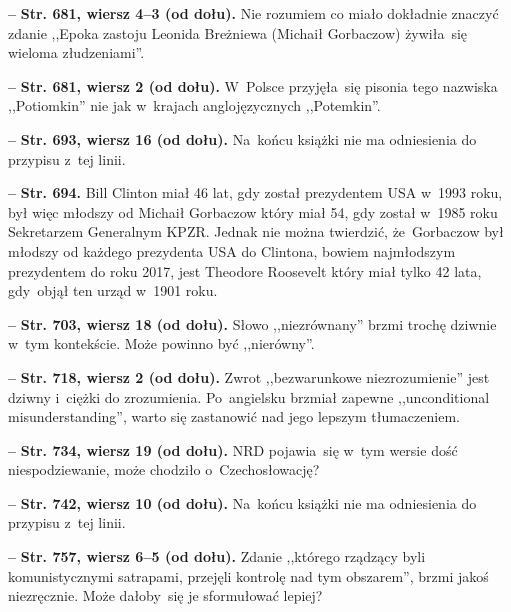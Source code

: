 \documentclass[a4paper,11pt]{article}
\newcommand{\spaceFour}{0.5em}
\newcommand{\tb}{\textbf}
\newcommand{\noi}{\noindent}
\newcommand{\start}{\noi \tb{--} {}}
\newcommand{\Str}[1]{\tb{Str. #1.}}
\newcommand{\StrWd}[2]{\tb{Str. #1, wiersz #2 (od dołu).}}
\begin{document}
\vspace{\spaceFour}


\start \StrWd{681}{4--3} Nie rozumiem co miało dokładnie znaczyć
zdanie ,,Epoka zastoju Leonida Breżniewa (Michaił Gorbaczow)
żywiła~się wieloma złudzeniami''.

\vspace{\spaceFour}

\start \StrWd{681}{2} W~Polsce przyjęła~się pisonia tego nazwiska
,,Potiomkin'' nie jak w~krajach anglojęzycznych ,,Potemkin''.

\vspace{\spaceFour}


\start \StrWd{693}{16} Na~końcu książki nie ma odniesienia do przypisu
z~tej linii.

\vspace{\spaceFour}


\start \Str{694} Bill Clinton miał 46 lat, gdy został prezydentem USA
w~1993 roku, był więc młodszy od Michaił Gorbaczow który miał 54, gdy
został w~1985 roku Sekretarzem Generalnym KPZR. Jednak nie można
twierdzić, że~Gorbaczow był młodszy od każdego prezydenta USA do
Clintona, bowiem najmłodszym prezydentem do roku 2017, jest Theodore
Roosevelt który miał tylko 42 lata, gdy~objął ten urząd w~1901 roku.

\vspace{\spaceFour}


\start \StrWd{703}{18} Słowo ,,niezrównany'' brzmi trochę dziwnie
w~tym kontekście. Może powinno być ,,nierówny''.

\vspace{\spaceFour}


\start \StrWd{718}{2} Zwrot ,,bezwarunkowe niezrozumienie'' jest
dziwny i~ciężki do zrozumienia. Po~angielsku brzmiał zapewne
,,unconditional misunderstanding'', warto się zastanowić nad jego
lepszym tłumaczeniem.

\vspace{\spaceFour}


\start \StrWd{734}{19} NRD pojawia~się w~tym wersie dość
niespodziewanie, może chodziło o~Czechosłowację?

\vspace{\spaceFour}


\start \StrWd{742}{10} Na~końcu książki nie ma odniesienia do przypisu
z~tej linii.

\vspace{\spaceFour}


\start \StrWd{757}{6--5} Zdanie ,,którego rządzący byli
komunistycznymi satrapami, przejęli kontrolę nad tym obszarem'', brzmi
jakoś niezręcznie. Może dałoby~się je sformułować lepiej?
\end{document}
